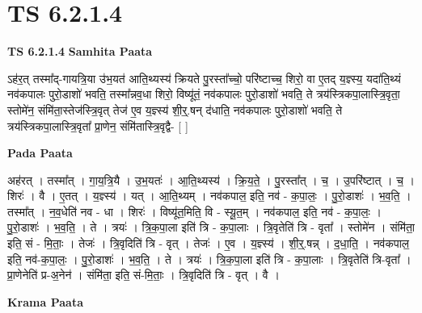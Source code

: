 \documentclass[17pt]{extarticle}
\begin{document}
\section{ TS 6.2.1.4 }

\textbf{TS 6.2.1.4 } \newline
\textbf{Samhita Paata} \newline

ऽह॑र॒त् तस्मा᳚द्-गायत्रि॒या उ॑भ॒यत॑ आति॒थ्यस्य॑ क्रियते पु॒रस्ता᳚च्चो॒ परि॑ष्टाच्च॒ शिरो॒ वा ए॒तद् य॒ज्ञ्स्य॒ यदा॑ति॒थ्यं नव॑कपालः पुरो॒डाशो॑ भवति॒ तस्मा᳚न्नव॒धा शिरो॒ विष्यू॑तं॒ नव॑कपालः पुरो॒डाशो॑ भवति॒ ते त्रय॑स्त्रिकपा॒लास्त्रि॒वृता॒ स्तोमे॑न॒ संमि॑ता॒स्तेज॑स्त्रि॒वृत् तेज॑ ए॒व य॒ज्ञ्स्य॑ शी॒र्॒.षन् द॑धाति॒ नव॑कपालः पुरो॒डाशो॑ भवति॒ ते त्रय॑स्त्रिकपा॒लास्त्रि॒वृता᳚ प्रा॒णेन॒ संमि॑तास्त्रि॒वृद्वै- [  ] \newline

\textbf{Pada Paata} \newline

अह॑रत् । तस्मा᳚त् । गा॒य॒त्रि॒यै । उ॒भ॒यतः॑ । आ॒ति॒थ्यस्य॑ । क्रि॒य॒ते॒ । पु॒रस्ता᳚त् । च॒ । उ॒परि॑ष्टात् । च॒ । शिरः॑ । वै । ए॒तत् । य॒ज्ञ्स्य॑ । यत् । आ॒ति॒थ्यम् । नव॑कपाल॒ इति॒ नव॑ - क॒पा॒लः॒ । पु॒रो॒डाशः॑ । भ॒व॒ति॒ । तस्मा᳚त् । न॒व॒धेति॑ नव - धा । शिरः॑ । विष्यू॑त॒मिति॒ वि - स्यू॒त॒म् । नव॑कपाल॒ इति॒ नव॑ - क॒पा॒लः॒ । पु॒रो॒डाशः॑ । भ॒व॒ति॒ । ते । त्रयः॑ । त्रि॒क॒पा॒ला इति॑ त्रि - क॒पा॒लाः । त्रि॒वृतेति॑ त्रि - वृता᳚ । स्तोमे॑न । संमि॑ता॒ इति॒ सं - मि॒ताः॒ । तेजः॑ । त्रि॒वृदिति॑ त्रि - वृत् । तेजः॑ । ए॒व । य॒ज्ञ्स्य॑ । शी॒र्॒.षन्न् । द॒धा॒ति॒ । नव॑कपाल॒ इति॒ नव॑-क॒पा॒लः॒ । पु॒रो॒डाशः॑ । भ॒व॒ति॒ । ते । त्रयः॑ । त्रि॒क॒पा॒ला इति॑ त्रि - क॒पा॒लाः । त्रि॒वृतेति॑ त्रि-वृता᳚ । प्रा॒णेनेति॑ प्र-अ॒नेन॑ । संमि॑ता॒ इति॒ सं-मि॒ताः॒ । त्रि॒वृदिति॑ त्रि - वृत् । वै ।  \newline


\textbf{Krama Paata} \newline
\end{document}
